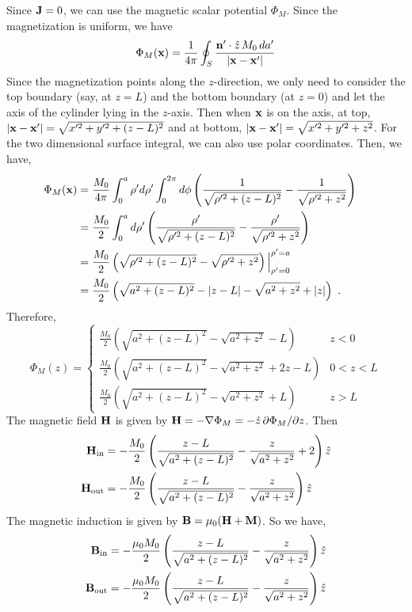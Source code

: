 \documentclass[12pt]{article}
\newcommand{\x}{{\bf x}}
\newcommand{\B}{{\bf B}}
\newcommand{\bJ}{{\bf J}}
\begin{document}
\newpage
{} Since $\bJ = 0$, we can use the magnetic scalar potential $\Phi_M$. Since the magnetization is uniform, we have
\begin{equation}
    \Phi_M(\x) = \frac{1}{4\pi} \oint_S \frac{{\bf n}' \cdot \hat{z}\, M_0 \, da' }{|\x - \x'|}
\end{equation}
Since the magnetization points along the $z$-direction, we only need to consider the top boundary (say, at $z = L$) and the bottom boundary (at $z = 0$) and let the axis of the cylinder lying in the $z$-axis. Then when $\x$ is on the axis, at top, $|\x - \x'| = \sqrt{x'^2 + y'^2 + (z - L)^2}$ and at bottom, $|\x - \x'| = \sqrt{x'^2 + y'^2 + z^2}$. For the two dimensional surface integral, we can also use polar coordinates. Then, we have,
\begin{align}
    \Phi_M(\x) &= \frac{M_0}{4\pi} \int_0^a \rho' d\rho' \int_0^{2\pi} d\phi \left(\frac{1}{\sqrt{\rho'^2 + (z - L)^2}} - \frac{1}{\sqrt{\rho'^2 + z^2}}\right)\cr
    &= \frac{M_0}{2} \int_0^a d\rho' \left(\frac{\rho'}{\sqrt{\rho'^2 + (z - L)^2}} - \frac{\rho'}{\sqrt{\rho'^2 + z^2}}\right)\cr
    &= \frac{M_0}{2} \left(\sqrt{\rho'^2 + (z-L)^2} - \sqrt{\rho'^2 + z^2} \right)\Big|_{\rho' = 0}^{\rho' = a}\cr
    &= \frac{M_0}{2} \left(\sqrt{a^2 + (z-L)^2} - |z - L| - \sqrt{a^2 + z^2} + |z|\right)~.
\end{align}
Therefore,
\begin{equation}
    \Phi_M(z) = \begin{cases}
        \frac{M_0}{2}\left(\sqrt{a^2 + (z-L)^2} - \sqrt{a^2 + z^2} - L\right) & z < 0\\
        \frac{M_0}{2}\left(\sqrt{a^2 + (z-L)^2} - \sqrt{a^2 + z^2} + 2z- L\right) & 0 < z < L\\
        \frac{M_0}{2}\left(\sqrt{a^2 + (z-L)^2} - \sqrt{a^2 + z^2} + L\right) & z > L
    \end{cases}
\end{equation}
The magnetic field ${\bf H}$ is given by ${\bf H} = - \nabla \Phi_M = - \hat{z}\,\partial \Phi_M/ \partial z$. Then
\begin{align}
    {\bf H}_{\rm in} &= -\frac{M_0}{2} \left(\frac{z-L}{\sqrt{a^2 + (z-L)^2} } - \frac{z}{\sqrt{a^2 + z^2}} + 2\right)\hat{z}\\
    {\bf H}_{\rm out} &= -\frac{M_0}{2} \left(\frac{z-L}{\sqrt{a^2 + (z-L)^2} } - \frac{z}{\sqrt{a^2 + z^2} }\right) \hat{z}
\end{align}
The magnetic induction is given by $\B = \mu_0 ({\bf H} + {\bf M})$. So we have,
\begin{align}
    \B_{\rm in} = -\frac{\mu_0 M_0}{2} \left(\frac{z-L}{\sqrt{a^2 + (z-L)^2} } - \frac{z}{\sqrt{a^2 + z^2}} \right) \hat{z} \\
    \B_{\rm out} = -\frac{\mu_0 M_0}{2} \left(\frac{z-L}{\sqrt{a^2 + (z-L)^2} } - \frac{z}{\sqrt{a^2 + z^2}} \right) \hat{z}
\end{align}
\end{document}

